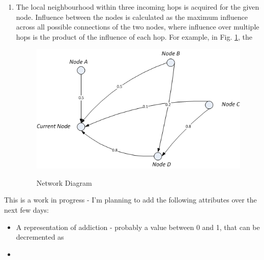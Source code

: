 \documentclass[]{article}
\begin{document}
\begin{enumerate}
\item The local neighbourhood within three incoming hops is acquired for the given node. Influence between the nodes is calculated as the maximum influence across all possible connections of the two nodes, where influence over multiple hops is the product of the influence of each hop. For example, in Fig. \ref{networkdiag}, the 
\begin{figure}[h]
\begin{center}
\includegraphics{networkdiag.png}
\label{networkdiag}
\caption{Network Diagram}
\end{center}
\end{figure}
\end{enumerate}
This is a work in progress - I'm planning to add the following attributes over the next few days:
\begin{itemize}
\item A representation of addiction - probably a value between 0 and 1, that can be decremented as 
\item
\end{itemize}
\end{document}
